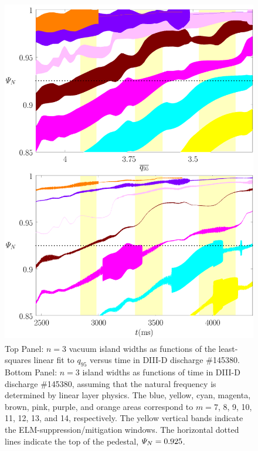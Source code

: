 \documentclass[12pt,prb,aps]{revtex4-1}
\begin{document}
\begin{figure}
\includegraphics[height=6in]{fig12.pdf}
\caption{Top Panel: $n=3$ vacuum island widths as functions of the least-squares linear fit to $q_{95}$ versus time
in   DIII-D discharge \#145380.
Bottom Panel:  $n=3$ island widths as functions of time
in   DIII-D discharge \#145380, assuming that the natural frequency is determined by linear layer physics. The blue, yellow, cyan, magenta, brown, pink,
purple, and orange  areas correspond to $m=7$, 8, 9, 10, 11, 12, 13, and 14, respectively. The yellow vertical bands indicate the ELM-suppression/mitigation windows. 
The horizontal dotted lines indicate the top of the pedestal, ${\mit\Psi}_N=0.925$.} \label{fig12}
\end{figure}
\end{document}
